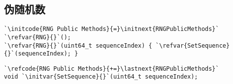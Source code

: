 \subsection{伪随机数}\label{sub:伪随机数}
{}
\begin{lstlisting}
`\initcode{RNG Public Methods}{=}\initnext{RNGPublicMethods}`
`\refvar{RNG}{}`();
`\refvar{RNG}{}`(uint64_t sequenceIndex) { `\refvar{SetSequence}{}`(sequenceIndex); }
\end{lstlisting}

\begin{lstlisting}
`\refcode{RNG Public Methods}{+=}\lastnext{RNGPublicMethods}`
void `\initvar{SetSequence}{}`(uint64_t sequenceIndex);
\end{lstlisting}